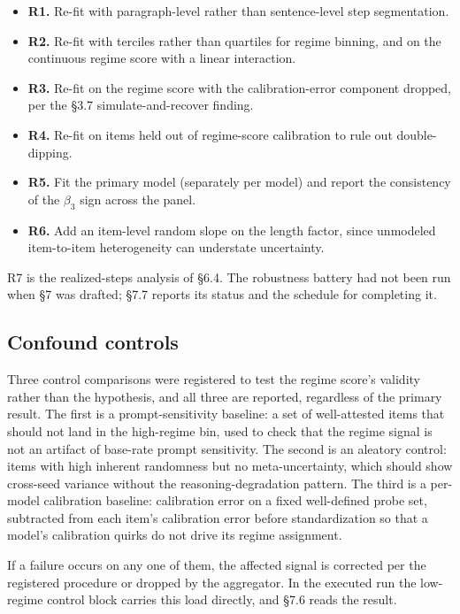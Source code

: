 \documentclass{article}
\providecommand{\tightlist}{\setlength{\itemsep}{0pt}\setlength{\parskip}{0pt}}
\begin{document}
\begin{itemize}
\tightlist
\item
  \textbf{R1.} Re-fit with paragraph-level rather than sentence-level
  step segmentation.
\item
  \textbf{R2.} Re-fit with terciles rather than quartiles for regime
  binning, and on the continuous regime score with a linear interaction.
\item
  \textbf{R3.} Re-fit on the regime score with the calibration-error
  component dropped, per the \S{}3.7 simulate-and-recover finding.
\item
  \textbf{R4.} Re-fit on items held out of regime-score calibration to
  rule out double-dipping.
\item
  \textbf{R5.} Fit the primary model (separately per model) and report
  the consistency of the \(\beta_{3}\) sign across the panel.
\item
  \textbf{R6.} Add an item-level random slope on the length factor,
  since unmodeled item-to-item heterogeneity can understate uncertainty.
\end{itemize}

R7 is the realized-steps analysis of \S{}6.4. The robustness battery had
not been run when \S{}7 was drafted; \S{}7.7 reports its status and the
schedule for completing it.

\subsection{Confound controls}\label{confound-controls}

Three control comparisons were registered to test the regime score's
validity rather than the hypothesis, and all three are reported,
regardless of the primary result. The first is a prompt-sensitivity
baseline: a set of well-attested items that should not land in the
high-regime bin, used to check that the regime signal is not an artifact
of base-rate prompt sensitivity. The second is an aleatory control:
items with high inherent randomness but no meta-uncertainty, which
should show cross-seed variance without the reasoning-degradation
pattern. The third is a per-model calibration baseline: calibration
error on a fixed well-defined probe set, subtracted from each item's
calibration error before standardization so that a model's calibration
quirks do not drive its regime assignment.

If a failure occurs on any one of them, the affected signal is corrected
per the registered procedure or dropped by the aggregator. In the
executed run the low-regime control block carries this load directly,
and \S{}7.6 reads the result.
\end{document}
